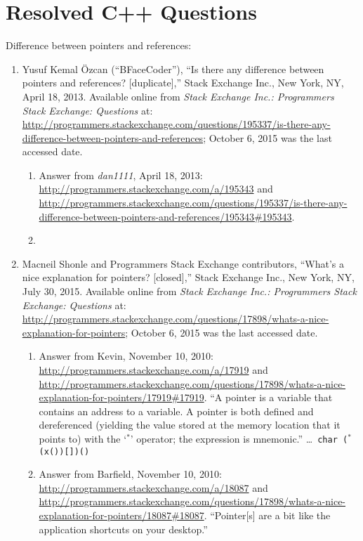 \section{Resolved C++ Questions}
\label{sec:ResolvedCppQuestions}


Difference between pointers and references: \vspace{-0.3cm}
\begin{enumerate} \itemsep -4pt
\item Yusuf Kemal {\"{O}}zcan (``BFaceCoder''), ``Is there any difference between pointers and references? [duplicate],'' Stack Exchange Inc., New York, NY, April 18, 2013. Available online from {\it Stack Exchange Inc.: Programmers Stack Exchange: Questions} at: \url{http://programmers.stackexchange.com/questions/195337/is-there-any-difference-between-pointers-and-references}; October 6, 2015 was the last accessed date. \vspace{-0.3cm}
	\begin{enumerate} \itemsep -2pt
	\item Answer from {\it dan1111}, April 18, 2013: \url{http://programmers.stackexchange.com/a/195343} and \url{http://programmers.stackexchange.com/questions/195337/is-there-any-difference-between-pointers-and-references/195343#195343}. 
	\item 
	\end{enumerate}
\item Macneil Shonle and Programmers Stack Exchange contributors, ``What's a nice explanation for pointers? [closed],'' Stack Exchange Inc., New York, NY, July 30, 2015. Available online from {\it Stack Exchange Inc.: Programmers Stack Exchange: Questions} at: \url{http://programmers.stackexchange.com/questions/17898/whats-a-nice-explanation-for-pointers}; October 6, 2015 was the last accessed date. \vspace{-0.3cm}
	\begin{enumerate} \itemsep -2pt
	\item Answer from Kevin, November 10, 2010: \url{http://programmers.stackexchange.com/a/17919} and \url{http://programmers.stackexchange.com/questions/17898/whats-a-nice-explanation-for-pointers/17919#17919}. ``A pointer is a variable that contains an address to a variable. A pointer is both defined and dereferenced (yielding the value stored at the memory location that it points to) with the `$^{\ast}$' operator; the expression is mnemonic.'' \dots\ {\tt char ($^{\ast}$(x())[])()}
	\item Answer from Barfield, November 10, 2010: \url{http://programmers.stackexchange.com/a/18087} and \url{http://programmers.stackexchange.com/questions/17898/whats-a-nice-explanation-for-pointers/18087#18087}. ``Pointer[s] are a bit like the application shortcuts on your desktop.''

\end{enumerate}
\end{enumerate}
